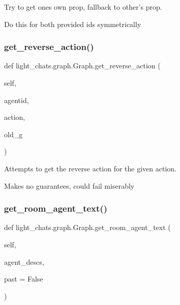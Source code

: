 \begin{DoxyVerb}Try to get ones own prop, fallback to other's prop.

Do this for both provided ids symmetrically
\end{DoxyVerb}
 \mbox{\label{classlight__chats_1_1graph_1_1Graph_a7b3fe43bf1e2b53fe7a2e22a24d77ef2}} 
\subsubsection{\texorpdfstring{get\+\_\+reverse\+\_\+action()}{get\_reverse\_action()}}
{\footnotesize\ttfamily def light\+\_\+chats.\+graph.\+Graph.\+get\+\_\+reverse\+\_\+action (\begin{DoxyParamCaption}\item[{}]{self,  }\item[{}]{agentid,  }\item[{}]{action,  }\item[{}]{old\+\_\+g }\end{DoxyParamCaption})}

\begin{DoxyVerb}Attempts to get the reverse action for the given action.

Makes no guarantees, could fail miserably
\end{DoxyVerb}
 \mbox{\label{classlight__chats_1_1graph_1_1Graph_abe32388ae807a26036573890d1293e2a}} 
\subsubsection{\texorpdfstring{get\+\_\+room\+\_\+agent\+\_\+text()}{get\_room\_agent\_text()}}
{\footnotesize\ttfamily def light\+\_\+chats.\+graph.\+Graph.\+get\+\_\+room\+\_\+agent\+\_\+text (\begin{DoxyParamCaption}\item[{}]{self,  }\item[{}]{agent\+\_\+descs,  }\item[{}]{past = {\ttfamily False} }\end{DoxyParamCaption})}

